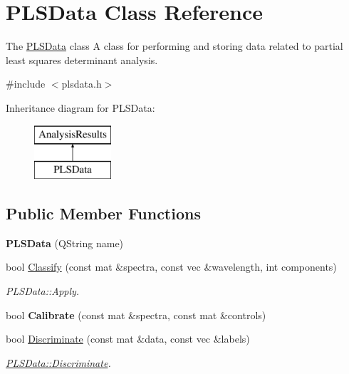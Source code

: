 \hypertarget{class_p_l_s_data}{}\section{P\+L\+S\+Data Class Reference}
\label{class_p_l_s_data}


The \hyperlink{class_p_l_s_data}{P\+L\+S\+Data} class A class for performing and storing data related to partial least squares determinant analysis.  




{\ttfamily \#include $<$plsdata.\+h$>$}

Inheritance diagram for P\+L\+S\+Data\+:\begin{figure}[H]
\begin{center}
\leavevmode
\includegraphics[height=2.000000cm]{class_p_l_s_data}
\end{center}
\end{figure}
\subsection*{Public Member Functions}
\begin{DoxyCompactItemize}
\item 
{\bfseries P\+L\+S\+Data} (Q\+String name)\hypertarget{class_p_l_s_data_a6400880564930ffc4ce682530f71907e}{}\label{class_p_l_s_data_a6400880564930ffc4ce682530f71907e}

\item 
bool \hyperlink{class_p_l_s_data_afef483f154b9c1daa2b82231e2d801c6}{Classify} (const mat \&spectra, const vec \&wavelength, int components)
\begin{DoxyCompactList}\small\item\em P\+L\+S\+Data\+::\+Apply. \end{DoxyCompactList}\item 
bool {\bfseries Calibrate} (const mat \&spectra, const mat \&controls)\hypertarget{class_p_l_s_data_a05e5883f1b22574cbbc6d84854b408fc}{}\label{class_p_l_s_data_a05e5883f1b22574cbbc6d84854b408fc}

\item 
bool \hyperlink{class_p_l_s_data_a03d83a38859dde637706399508ca617c}{Discriminate} (const mat \&data, const vec \&labels)
\begin{DoxyCompactList}\small\item\em \hyperlink{class_p_l_s_data_a03d83a38859dde637706399508ca617c}{P\+L\+S\+Data\+::\+Discriminate}. \end{DoxyCompactList}\end{DoxyCompactItemize}


